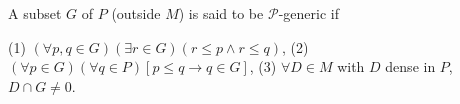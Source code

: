 A subset $G$ of $P$ (outside $M$) is said to be $\mathcal{P}$-generic if

(1) $(\forall p, q \in G)(\exists r \in G)(r \leq p \land r \leq q)$,
(2) $(\forall p \in G)(\forall q \in P)[p \leq q \rightarrow q \in G]$,
(3) $\forall D \in M$ with $D$ dense in $P$, $D \cap G \neq 0$.
